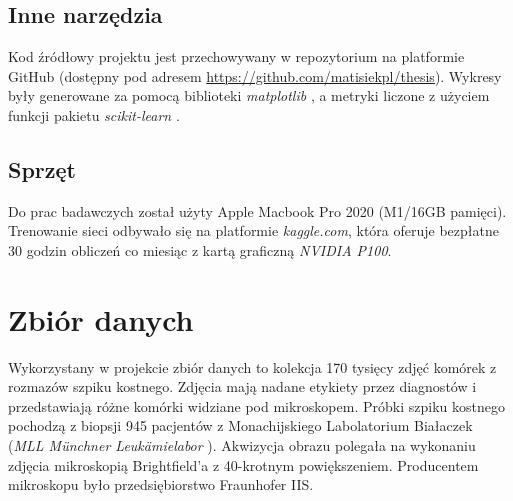 \subsection{Inne narzędzia}

Kod źródłowy projektu jest przechowywany w repozytorium na platformie GitHub (dostępny pod adresem \url{https://github.com/matisiekpl/thesis}).
Wykresy były generowane za pomocą biblioteki \textit{matplotlib} \cite{matplotlib},
a metryki liczone z użyciem funkcji pakietu \textit{scikit-learn} \cite{scikit_learn}.

\subsection{Sprzęt}

Do prac badawczych został użyty Apple Macbook Pro 2020 (M1/16GB pamięci).
Trenowanie sieci odbywało się na platformie \textit{kaggle.com}, która oferuje bezpłatne 30 godzin obliczeń co miesiąc z kartą graficzną \textit{NVIDIA P100}.


\section{Zbiór danych}

Wykorzystany w projekcie zbiór danych to kolekcja 170 tysięcy zdjęć komórek z rozmazów szpiku kostnego.
Zdjęcia mają nadane etykiety przez diagnostów i przedstawiają różne komórki widziane pod mikroskopem.
Próbki szpiku kostnego pochodzą z biopsji 945 pacjentów z Monachijskiego Labolatorium Białaczek (\textit{MLL Münchner Leukämielabor} \cite{mll}).
Akwizycja obrazu polegała na wykonaniu zdjęcia mikroskopią Brightfield'a z 40-krotnym powiększeniem.
Producentem mikroskopu było przedsiębiorstwo Fraunhofer IIS.

